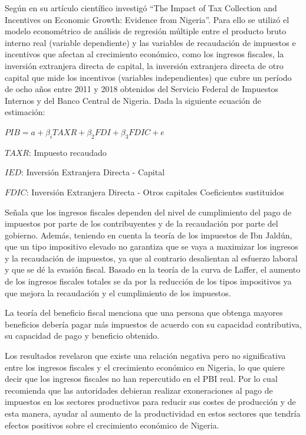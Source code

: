 \documentclass[
  letterpaper,
]{article}
\begin{document}
Según \textcite{akanbi_impact_2020} en su artículo científico investigó
``The Impact of Tax Collection and Incentives on Economic Growth:
Evidence from Nigeria''. Para ello se utilizó el modelo econométrico de
análisis de regresión múltiple entre el producto bruto interno real
(variable dependiente) y las variables de recaudación de impuestos e
incentivos que afectan al crecimiento económico, como los ingresos
fiscales, la inversión extranjera directa de capital, la inversión
extranjera directa de otro capital que mide los incentivos (variables
independientes) que cubre un período de ocho años entre 2011 y 2018
obtenidos del Servicio Federal de Impuestos Internos y del Banco Central
de Nigeria. Dada la siguiente ecuación de estimación:

\(PIB = a + β_i TAXR + β_2 FDI + β_3 FDIC + e\)

\(TAXR\): Impuesto recaudado

\(IED\): Inversión Extranjera Directa - Capital

\(FDIC\): Inversión Extranjera Directa - Otros capitales Coeficientes
sustituidos

Señala que los ingresos fiscales dependen del nivel de cumplimiento del
pago de impuestos por parte de los contribuyentes y de la recaudación
por parte del gobierno. Además, teniendo en cuenta la teoría de los
impuestos de Ibn Jaldún, que un tipo impositivo elevado no garantiza que
se vaya a maximizar los ingresos y la recaudación de impuestos, ya que
al contrario desalientan al esfuerzo laboral y que se dé la evasión
fiscal. Basado en la teoría de la curva de Laffer, el aumento de los
ingresos fiscales totales se da por la reducción de los tipos
impositivos ya que mejora la recaudación y el cumplimiento de los
impuestos.

La teoría del beneficio fiscal menciona que una persona que obtenga
mayores beneficios debería pagar más impuestos de acuerdo con su
capacidad contributiva, su capacidad de pago y beneficio obtenido.

Los resultados revelaron que existe una relación negativa pero no
significativa entre los ingresos fiscales y el crecimiento económico en
Nigeria, lo que quiere decir que los ingresos fiscales no han
repercutido en el PBI real. Por lo cual recomienda que las autoridades
debieran realizar exoneraciones al pago de impuestos en los sectores
productivos para reducir sus costes de producción y de esta manera,
ayudar al aumento de la productividad en estos sectores que tendría
efectos positivos sobre el crecimiento económico de Nigeria.
\end{document}
